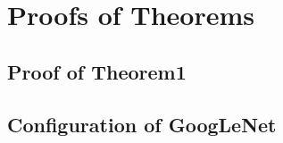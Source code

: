 \chapter{Proofs of Theorems}
\section{Proof of Theorem1}

\section{Configuration of GoogLeNet}
\begin{landscape}

\end{landscape}
